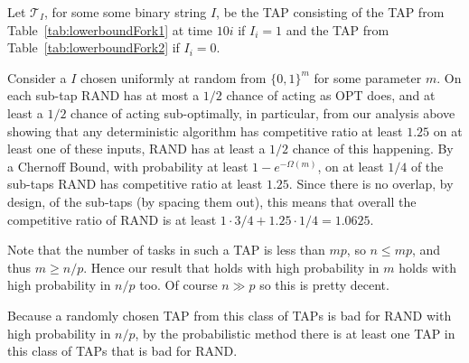 Let $\mathcal{T}_{I}$, for some some binary string $I$, be the
TAP consisting of the TAP from Table~\ref{tab:lowerboundFork1} at
time $10i$ if $I_i = 1$ and the TAP from
Table~\ref{tab:lowerboundFork2} if $I_i = 0$. 

Consider a $I$ chosen uniformly at random from $\{0,1\}^m$ for
some parameter $m$.
On each sub-tap RAND has at most a $1/2$ chance of acting as OPT
does, and at least a $1/2$ chance of acting sub-optimally, in
particular, from our analysis above showing that any deterministic
algorithm has competitive ratio at least $1.25$ on at least one
of these inputs, RAND has at least a $1/2$ chance of this
happening.
By a Chernoff Bound, with probability at least
$1-e^{-\Omega(m)}$, on at least $1/4$ of the sub-taps RAND has
competitive ratio at least $1.25$. Since there is no overlap, by
design, of the sub-taps (by spacing them out), this means that
overall the competitive ratio of RAND is at least $1\cdot 3/4 +
1.25 \cdot 1/4 = 1.0625.$

Note that the number of tasks in such a TAP is less than $mp$, so
$n \le mp$, and thus $m \ge n/p$.
Hence our result that holds with high probability in $m$ holds
with high probability in $n/p$ too.
Of course $n\gg p$ so this is pretty decent.

Because a randomly chosen TAP from this class of TAPs is bad for
RAND with high probability in $n/p$, by the probabilistic method
there is at least one TAP in this class of TAPs that is bad for
RAND. 


